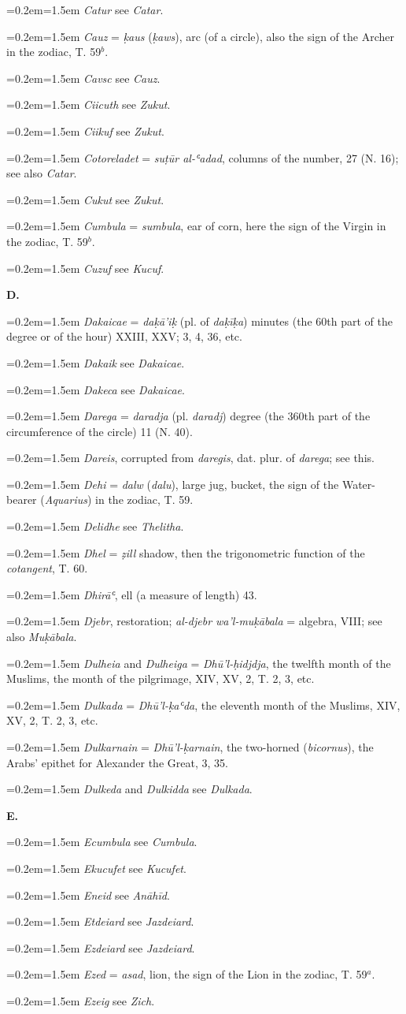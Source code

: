 \documentclass[11pt]{article}
\newcommand{\Entry}[1]{\par{\parskip=0.2em\relax\noindent\hangindent=1.5em\hangafter=1 #1\par}}
\begin{document}
\Entry{\emph{Catur} see \emph{Catar}.}
\Entry{\emph{Cauz} = \emph{ḳaus} (\emph{ḳaws}), arc (of a circle), also the sign of the Archer in the zodiac, T. 59$^{b}$.}
\Entry{\emph{Cavsc} see \emph{Cauz}.}
\Entry{\emph{Ciicuth} see \emph{Zukut}.}
\Entry{\emph{Ciikuf} see \emph{Zukut}.}
\Entry{\emph{Cotoreladet} = \emph{suṭūr al-ʿadad}, columns of the number, 27 (N. 16); see also \emph{Catar}.}
\Entry{\emph{Cukut} see \emph{Zukut}.}
\Entry{\emph{Cumbula} = \emph{sumbula}, ear of corn, here the sign of the Virgin in the zodiac, T. 59$^{b}$.}
\Entry{\emph{Cuzuf} see \emph{Kucuf}.}
\par\begin{center}\textbf{D.}\end{center}
\Entry{\emph{Dakaicae} = \emph{daḳā’iḳ} (pl. of \emph{daḳīḳa}) minutes (the 60th part of the degree or of the hour) XXIII, XXV; 3, 4, 36, etc.}
\Entry{\emph{Dakaik} see \emph{Dakaicae}.}
\Entry{\emph{Dakeca} see \emph{Dakaicae}.}
\Entry{\emph{Darega} = \emph{daradja} (pl. \emph{daradj}) degree (the 360th part of the circumference of the circle) 11 (N. 40).}
\Entry{\emph{Dareis}, corrupted from \emph{daregis}, dat. plur. of \emph{darega}; see this.}
\Entry{\emph{Dehi} = \emph{dalw} (\emph{dalu}), large jug, bucket, the sign of the Water-bearer (\emph{Aquarius}) in the zodiac, T. 59.}
\Entry{\emph{Delidhe} see \emph{Thelitha}.}
\Entry{\emph{Dhel} = \emph{ẓill} shadow, then the trigonometric function of the \emph{cotangent}, T. 60.}
\Entry{\emph{Dhirāʿ}, ell (a measure of length) 43.}
\Entry{\emph{Djebr}, restoration; \emph{al-djebr wa’l-muḳābala} = algebra, VIII; see also \emph{Muḳābala}.}
\Entry{\emph{Dulheia} and \emph{Dulheiga} = \emph{Dhū’l-ḥidjdja}, the twelfth month of the Muslims, the month of the pilgrimage, XIV, XV, 2, T. 2, 3, etc.}
\Entry{\emph{Dulkada} = \emph{Dhū’l-ḳaʿda}, the eleventh month of the Muslims, XIV, XV, 2, T. 2, 3, etc.}
\Entry{\emph{Dulkarnain} = \emph{Dhū’l-ḳarnain}, the two-horned (\emph{bicornus}), the Arabs' epithet for Alexander the Great, 3, 35.}
\Entry{\emph{Dulkeda} and \emph{Dulkidda} see \emph{Dulkada}.}
\par\begin{center}\textbf{E.}\end{center}
\Entry{\emph{Ecumbula} see \emph{Cumbula}.}
\Entry{\emph{Ekucufet} see \emph{Kucufet}.}
\Entry{\emph{Eneid} see \emph{Anāhīd}.}
\Entry{\emph{Etdeiard} see \emph{Jazdeiard}.}
\Entry{\emph{Ezdeiard} see \emph{Jazdeiard}.}
\Entry{\emph{Ezed} = \emph{asad}, lion, the sign of the Lion in the zodiac, T. 59$^{a}$.}
\Entry{\emph{Ezeig} see \emph{Zich}.}
\end{document}
